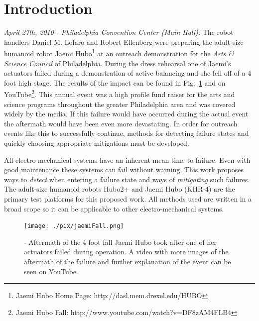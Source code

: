 \section{Introduction}

\textit{April 27th, 2010 - Philadelphia Convention Center (Main Hall):}  The robot handlers Daniel M. Lofaro 
and Robert Ellenberg were preparing the adult-size humanoid robot Jaemi Hubo\footnote{Jaemi Hubo Home Page: http://dasl.mem.drexel.edu/HUBO} at an outreach demonstration for the 
\textit{Arts \& Science Council} of Philadelphia.  During the dress rehearsal one of Jaemi's actuators failed 
during a demonstration of active balancing and she fell off of a 4 foot high stage.  The results of the impact 
can be found in Fig.~\ref{fig:fall} and on YouTube\footnote{Jaemi Hubo Fall: http://www.youtube.com/watch?v=DF8zAM4FLB4\label{link:fall}}.  
This annual event was a high profile fund raiser for the arts and science programs throughout the greater Philadelphia area and was covered widely by the media.  If this failure would have occurred during the actual event the 
aftermath would have been even more devastating.  In order for outreach events like this to successfully continue, methods 
for detecting failure states and quickly choosing appropriate mitigations must be developed.

All electro-mechanical systems have an inherent mean-time to failure.  Even with good maintenance these systems can fail without warning.  This work proposes ways to \textit{detect} when entering a failure state and ways of \textit{mitigating} such failures.  The adult-size humanoid robots Hubo2+ and Jaemi Hubo (KHR-4) are the primary test platforms for this proposed work.  All methods used are written in a broad scope so it can be applicable to other electro-mechanical systems.

\begin{figure}[t]
  \centering
\texttt{[image: ./pix/jaemiFall.png]}
  \caption{-  Aftermath of the 4 foot fall Jaemi Hubo took after one of her actuators failed during operation.  A video with more images of the aftermath of the failure and further explanation of the event can be seen on YouTube.}%
  \label{fig:fall}
\end{figure}  

